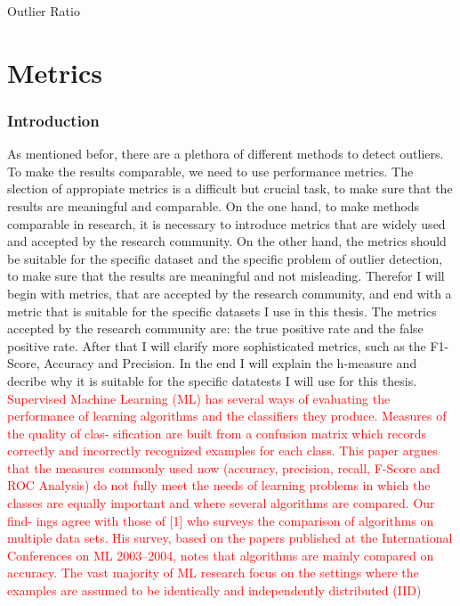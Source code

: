 Outlier Ratio

\section{Metrics}
\subsubsection{Introduction}
As mentioned befor, there are a plethora of different methods to detect outliers.
To make the results comparable, we need to use performance metrics.
The slection of appropiate metrics is a difficult but crucial task, to make sure that the results are meaningful and comparable.
On the one hand, to make methods comparable in research, it is necessary to introduce metrics that are widely used and accepted by the research community.
On the other hand, the metrics should be suitable for the specific dataset and the specific problem of outlier detection, to make sure that the results are meaningful and not misleading.
Therefor I will begin with metrics, that are accepted by the research community, and end with a metric that is suitable for the specific datasets I use in this thesis. 
The metrics accepted by the research community are: the true positive rate and the false positive rate.
After that I will clarify more sophisticated metrics, such as the F1-Score, Accuracy and Precision.
In the end I will explain the h-measure and decribe why it is suitable for the specific datatests I will use for this thesis.
\textcolor{red}{Supervised Machine Learning (ML) has several ways of evaluating the performance of
learning algorithms and the classifiers they produce. Measures of the quality of clas-
sification are built from a confusion matrix which records correctly and incorrectly
recognized examples for each class. This paper argues that the measures commonly used now (accuracy, precision, recall,
F-Score and ROC Analysis) do not fully meet the needs of learning problems in which the classes are 
equally important and where several algorithms are compared. Our find-
ings agree with those of [1] who surveys the comparison of algorithms on multiple data
sets. His survey, based on the papers published at the International Conferences on ML
2003–2004, notes that algorithms are mainly compared on accuracy.
The vast majority of ML research focus on the settings where the examples are assumed
to be identically and independently distributed (IID)}

